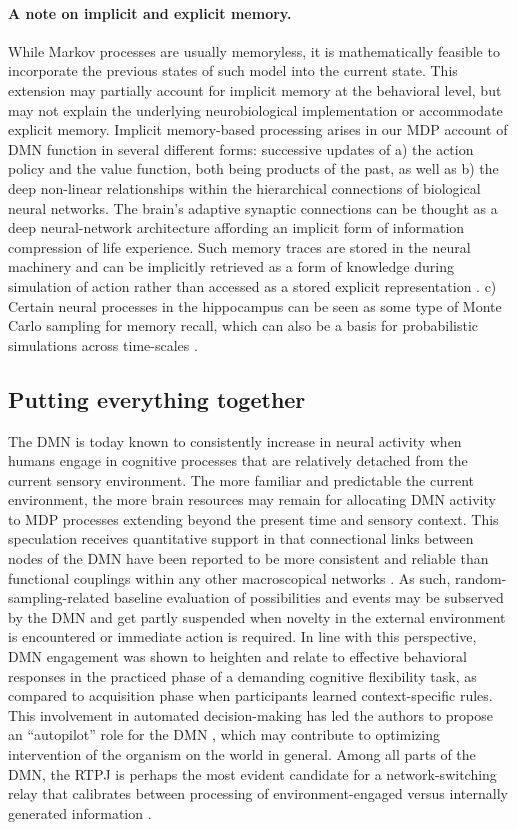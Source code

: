 \documentclass[10pt,letterpaper]{article}
\begin{document}
\paragraph*{A note on implicit and explicit memory.}
While Markov processes are usually memoryless, it is mathematically feasible to
incorporate the previous states of such model into the current state. This
extension may partially account for implicit memory at the behavioral level, but
may not explain the underlying neurobiological implementation or accommodate
explicit memory. Implicit memory-based processing arises in our MDP account of
DMN function in several different forms: successive updates of a) the action
policy and the value function, both being products of the past, as well as b)
the deep non-linear relationships within the hierarchical connections of
biological neural networks. The brain's adaptive synaptic connections can be
thought as a deep neural-network architecture affording an implicit form of
information compression of life experience. Such memory traces are stored in the
neural machinery and can be implicitly retrieved as a form of knowledge during
simulation of action rather than accessed as a stored explicit representation
\citep{pezzulo2011grounding}. c) Certain neural processes in the hippocampus can
be seen as some type of Monte Carlo sampling for memory recall, which can also
be a basis for probabilistic simulations across time-scales
\citep{schacter2007remembering,Axelrod2017}.


\subsection{Putting everything together}
The DMN is today known to consistently increase in neural
activity when humans engage in cognitive processes that are relatively detached from
the current sensory environment.
The more familiar and predictable the current environment, the more brain resources may remain for allocating DMN activity to MDP processes extending beyond the present time and sensory context.
%
This speculation receives quantitative support in that connectional links between
nodes of the DMN have been reported to be more consistent and reliable than
functional couplings within any other macroscopical networks \citep{shehz2009}.
As such, random-sampling-related baseline evaluation of possibilities and
events may be subserved by the DMN and get partly suspended when novelty in
the external environment is encountered or immediate action is required.
%
In line with this perspective, DMN engagement was shown to heighten and relate to effective behavioral responses in the practiced phase of a demanding cognitive flexibility task, as compared to acquisition phase when participants learned context-specific rules. This involvement in automated decision-making has led the authors to propose an ``autopilot'' role for the DMN \citep{vatansever2017pnas}, which may contribute to optimizing intervention of the organism on the world in general. Among all parts of the DMN, the RTPJ is perhaps the most evident candidate for a network-switching relay that calibrates between processing of environment-engaged versus internally generated information \citep{downar2000multimodal, golland2006extrinsic, bzdok2013tpj}.
\end{document}

